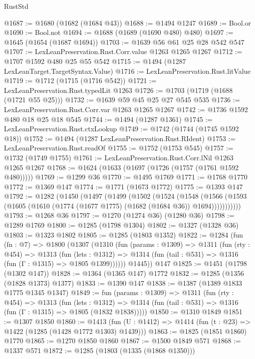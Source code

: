 \begin{lexlean}{RustStd}
\begin{coremodule}
@1687 := @1680 (@1682 (@1684 @43))
@1688 := @1494 @1247
@1689 := Bool.or
@1690 := Bool.not
@1694 := @1688 (@1689 (@1690 @480) @480)
@1697 := @1645 (@1654 (@1687 @1694))
@1703 := @1639 @56 @61 @25 @28 @542 @547
@1707 := LexLeanPreservation.Rust.Corr.value @1263 @1265 @1267
@1712 := @1707 @1592 @480 @25 @55 @542
@1715 := @1494 (@1287 LexLeanTarget.TargetSyntax.Value)
@1716 := LexLeanPreservation.Rust.litValue
@1719 := @1712 (@1715 (@1716 @542))
@1721 := LexLeanPreservation.Rust.typedLit @1263
@1726 := @1703 (@1719 (@1688 (@1721 @55 @25)))
@1732 := @1639 @59 @45 @25 @27 @545 @535
@1736 := LexLeanPreservation.Rust.Corr.var @1263 @1265 @1267
@1742 := @1736 @1592 @480 @18 @25 @18 @545
@1744 := @1494 (@1287 @1361)
@1745 := LexLeanPreservation.Rust.ctxLookup
@1749 := @1742 (@1744 (@1745 @1592 @18))
@1752 := @1494 (@1287 LexLeanPreservation.Rust.RIdent)
@1753 := LexLeanPreservation.Rust.readOf
@1755 := @1752 (@1753 @545)
@1757 := @1732 (@1749 @1755)
@1761 := LexLeanPreservation.Rust.Corr.lNil @1263 @1265 @1267
@1768 := @1624 (@1633 (@1697 (@1726 (@1757 (@1761 @1592 @480)))))
@1769 := @1299 @36
@1770 := @1495 @1769
@1771 := @1768 @1770
@1772 := @1369 @147
@1774 := @1771 (@1673 @1772)
@1775 := @1393 @147
@1792 := @1282
    (@1450
      (@1497
        (@1499
          (@1502
            (@1524
              (@1548
                (@1566
                  (@1593 (@1605 (@1610 (@1774 (@1677 @1775) (@1682 (@1684 @36)) @1694)))))))))))
@1793 := @1268 @36
@1797 := @1270 (@1274 @36) (@1280 @36)
@1798 := @1289 @1769
@1800 := @1285 (@1798 @1304)
@1802 := @1327 (@1328 @36)
@1803 := @1323 @1802
@1805 := @1285 (@1803 @1352)
@1822 := @1284
    (fun (fn : @7) =>
    @1800
      (@1307
        (@1310
          (fun (params : @1309) =>
          @1311
            (fun (rty : @454) =>
            @1313
              (fun (lets : @1312) =>
              @1314 (fun (tail : @531) => @1316 (fun (Γ : @1315) => @1805 @1399))))))
        @1445))
    @147
@1825 := @1451 (@1798 (@1302 @147))
@1828 := @1364 (@1365 @147) @1772
@1832 := @1285 (@1356 (@1828 @1373) @1377)
@1833 := @1390 @147
@1838 := @1387 (@1389 @1833 @1775 @1345 @1347)
@1849 := fun (params : @1309) =>
  @1311
    (fun (rty : @454) =>
    @1313
      (fun (lets : @1312) =>
      @1314 (fun (tail : @531) => @1316 (fun (Γ : @1315) => @1805 (@1832 @1838)))))
@1850 := @1310 @1849
@1851 := @1307 @1850
@1860 := @1413 (fun (U : @1412) => @1414 (fun (t : @23) => @1422 (@1285 (@1428 @1772 @1303) @1439)))
@1863 := @1825 (@1851 @1860) @1770
@1865 := @1270 @1850 @1860
@1867 := @1500 @1849 @571
@1868 := @1337 @571
@1872 := @1285 (@1803 (@1335 (@1868 @1350)))

\end{coremodule}
\end{lexlean}
